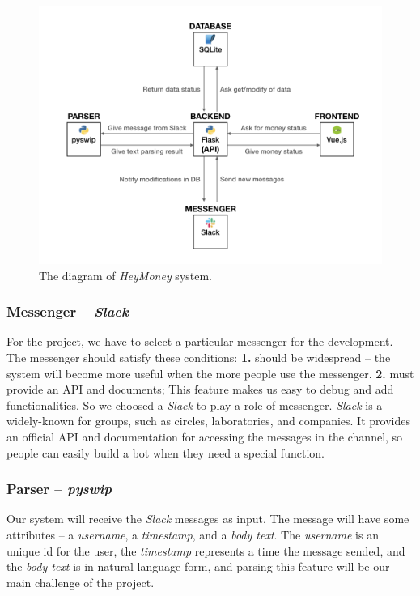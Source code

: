 \documentclass[11pt]{article}
\begin{document}
\begin{figure}[!htbp]
  \centering
  \includegraphics[width=\textwidth]{images/cl-hw3-diagram.png}
  \caption{The diagram of \textit{HeyMoney} system.}
  \label{fig:diagram}
\end{figure}

\subsubsection{Messenger -- \textit{Slack}}

For the project, we have to select a particular messenger for the development.
The messenger should satisfy these conditions:
\textbf{1.} should be widespread --
the system will become more useful when the more people use the messenger.
\textbf{2.} must provide an API and documents;
This feature makes us easy to debug and add functionalities.
So we choosed a \textit{Slack} to play a role of messenger.
\textit{Slack} is a widely-known for groups,
such as circles, laboratories, and companies.
It provides an official API and documentation
for accessing the messages in the channel,
so people can easily build a bot when they need a special function.

\subsubsection{Parser -- \textit{pyswip}}
Our system will receive the \textit{Slack} messages as input.
The message will have some attributes -- a \textit{username}, a \textit{timestamp},
and a \textit{body text}.
The \textit{username} is an unique id for the user,
the \textit{timestamp} represents a time the message sended,
and the \textit{body text} is in natural language form,
and parsing this feature will be our main challenge of the project.
\end{document}

